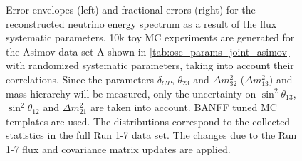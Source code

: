 \begin{figure}[htb]
\caption {
Error envelopes (left) and fractional errors (right) for the reconstructed neutrino energy spectrum
as a result of the flux systematic parameters.
10k toy MC experiments are generated for the Asimov data set A shown in \cref{tab:osc_params_joint_asimov}
with randomized systematic parameters, taking into account their correlations.
Since the parameters $\delta_{CP}$, $\theta_{23}$ and $\Delta m^2_{32}$ ($\Delta m^2_{13}$) and mass hierarchy
will be measured,
only the uncertainty on 
$\sin^2 \theta_{13}$,
$\sin^2 \theta_{12}$
and 
$\Delta m^2_{21}$ 
are taken into account.
BANFF tuned MC templates are used. 
The distributions correspond to the collected statistics in the full Run 1-7 data set.
The changes due to the Run 1-7 flux and covariance matrix updates are applied.
}
\label{fig:flux_envelope_Asimov_A_run17}
\end{figure}


